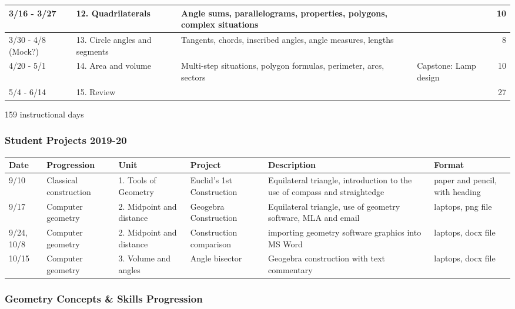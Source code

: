 \documentclass[12pt, twoside]{article}
\begin{document}
\begin{tabular}{|p{2.4cm}|p{4.7cm}|p{9cm}|p{4cm}|r|}
  \hline
  3/16 - 3/27 & 12. Quadrilaterals & Angle sums, parallelograms, properties, polygons, complex situations & & 10 \\
  \hline
  3/30 - 4/8 (Mock?) & 13. Circle angles and segments & Tangents, chords, inscribed angles, angle measures, lengths &  & 8 \\
  \hline
  4/20 - 5/1 & 14. Area and volume & Multi-step situations,  polygon formulas, perimeter, arcs, sectors &Capstone: Lamp design & 10 \\
  \hline
  5/4 - 6/14 & 15. Review &  & & 27 \\
  \hline
\end{tabular}

159 instructional days

\newpage
\subsubsection*{Student Projects 2019-20}

\begin{tabular}{|p{1cm}|p{2.5cm}|p{3cm}|p{4cm}|p{8cm}|p{4cm}|}
  \hline
  Date & Progression & Unit & Project & Description & Format \\
  \hline
  9/10 & Classical construction & 1. Tools of Geometry & Euclid's 1st Construction & Equilateral triangle, introduction to the use of compass and straightedge & paper and pencil, with heading \\
  \hline
  9/17 & Computer geometry & 2. Midpoint and distance & Geogebra Construction & Equilateral triangle, use of geometry software, MLA and email & laptops, png file \\
  \hline
  9/24, 10/8 & Computer geometry & 2. Midpoint and distance & Construction comparison & importing geometry software graphics into MS Word & laptops, docx file \\
  \hline
  10/15 & Computer geometry & 3. Volume and angles & Angle bisector & Geogebra construction with text commentary & laptops, docx file \\
  \hline
\end{tabular}

\newpage
\subsubsection*{Geometry Concepts \& Skills Progression}
\end{document}
